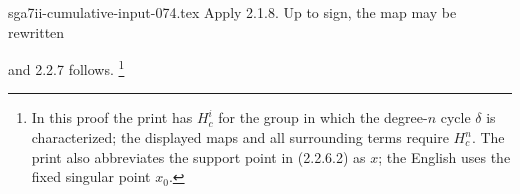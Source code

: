 \begin{filecontents*}{sga7ii-cumulative-input-074.tex}
Apply 2.1.8.  Up to sign, the map may be rewritten
\begin{center}
\end{center}
and 2.2.7 follows.
\footnote{In this proof the print has $H_c^i$ for the group in which
the degree-$n$ cycle $\delta$ is characterized; the displayed maps
and all surrounding terms require $H_c^n$.  The print also abbreviates
the support point in (2.2.6.2) as $x$; the English uses the fixed
singular point $x_0$.}
\end{filecontents*}
